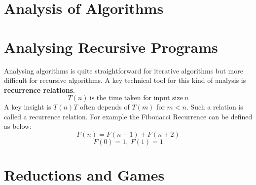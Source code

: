 \documentclass{article}
\theoremstyle{definition}
\begin{document}
\section{Analysis of Algorithms}

\section{Analysing Recursive Programs}
Analysing algorithms is quite straightforward for iterative algorithms but more difficult for recursive algorithms. A key technical tool for this kind of analysis is \textbf{recurrence relations}. 
\begin{equation}
T(n)\ \text{is the time taken for input size}\ n
\end{equation}
A key insight is $T(n)T$ often depends of $T(m)$ for $m < n$. Such a relation is called a recurrence relation. For example the Fibonacci Recurrence can be defined as below:
\begin{equation}
F(n) = F(n - 1) + F(n+2)
\end{equation}
\begin{equation}
F(0) = 1,\ F(1) = 1
\end{equation}


\section{Reductions and Games}
\end{document}
